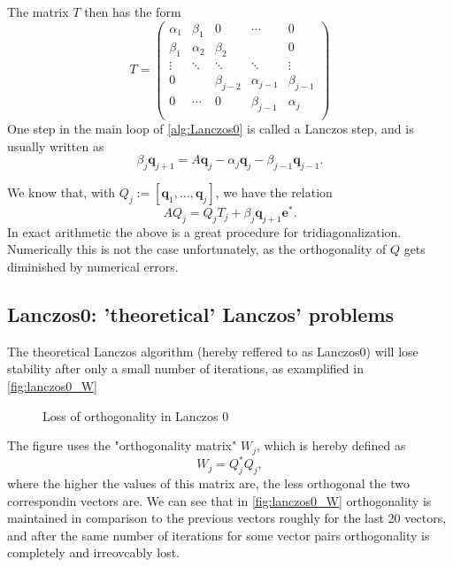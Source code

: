 \documentclass{article}
\begin{document}
	The matrix $T$ then has the form 
	$$T=\begin{pmatrix}
		\alpha_1&\beta_1&0&\cdots&0\\
		\beta_1&\alpha_2&\beta_2&&0\\
		\vdots&\ddots&\ddots&\ddots&\vdots\\
		0&&\beta_{j-2}&\alpha_{j-1}&\beta_{j-1}\\
		0&\cdots&0&\beta_{j-1}&\alpha_{j}\\
	\end{pmatrix}$$
	One step in the main loop of \autoref{alg:Lanczos0} is called a Lanczos step, and is usually written as
	\begin{equation}\label{eq:LanczosStep}
		\beta_j\mathbf{q}_{j+1}=A\mathbf{q}_j-\alpha_j\mathbf{q}_j-\beta_{j-1}\mathbf{q}_{j-1}.
	\end{equation}
	
	We know that, with $Q_{j}:=[\mathbf{q}_1,\ldots,\mathbf{q}_j]$, we have the relation
	\begin{equation}\label{eq:matLanczos}
		AQ_{j}=Q_jT_j+\beta_{j}\mathbf{q}_{j+1}\mathbf{e}^{\ast}.
	\end{equation}
	In exact arithmetic the above is a great procedure for tridiagonalization. Numerically this is
	not the case unfortunately, as the orthogonality of $Q$ gets diminished by numerical errors.
	
	\subsection{Lanczos0: 'theoretical' Lanczos' problems}
	
	The theoretical Lanczos algorithm (hereby reffered to as Lanczos0) will lose stability after only a small number of iterations, as examplified in \autoref{fig:lanczos0_W}
	\begin{figure}
		\centering
		\resizebox{\textwidth}{!}{
		}
		\caption{Loss of orthogonality in Lanczos 0}\label{fig:lanczos0_W}
	\end{figure}
	
	 The figure uses the "orthogonality matrix" $W_j$, which is hereby defined as
	\begin{equation}
		W_j = Q_j^\ast Q_j,
	\end{equation}
	where the higher the values of this matrix are, the less orthogonal the two correspondin vectors are.
	We can see that in \autoref{fig:lanczos0_W} orthogonality is maintained in comparison to the previous vectors roughly for the last 20 vectors, and after the same number of iterations for some vector pairs orthogonality is completely and irreovcably lost.
	
\end{document}
